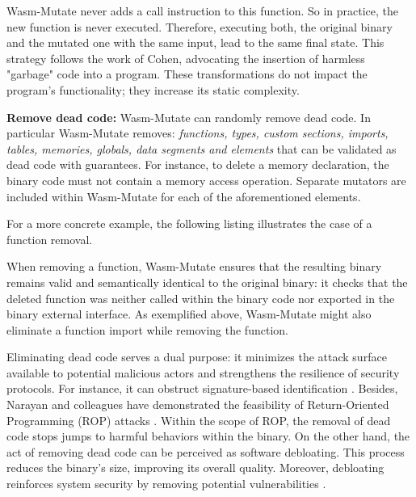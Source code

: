\documentclass[sigplan,screen]{acmart}
\newcommand*\badge[1]{ \colorbox{red}{\color{white}#1}}
\newcommand{\tool}{{\sc Wasm-Mutate}\xspace}
\newcommand{\todo}[1]{%
\refstepcounter{todo}
\noindent\textbf{\badge{TODO}} {\color{red}#1}
\addcontentsline{td}{todo}
{\color{red}\thesection.\thetodo\xspace #1}}
\begin{document}


\tool never adds a call instruction to this function.
So in practice, the new function is never executed.
Therefore, executing both, the original binary and the mutated one with the same input, lead to the same final state.
This strategy follows the work of Cohen, advocating the insertion of harmless "garbage" code into a program. 
These transformations do not impact the program's functionality; they increase its static complexity.

\textbf{Remove dead code:} \tool can randomly remove dead code.
In particular \tool removes: \emph{functions, types, custom sections, imports, tables, memories, globals, data segments and elements} that can be validated as dead code with guarantees.
For instance, to delete a memory declaration, the binary code must not contain a memory access operation. 
Separate mutators are included within \tool for each of the aforementioned elements.

For a more concrete example, the following listing illustrates the case of a function removal.



When removing a function, \tool ensures that the resulting binary remains valid and semantically identical to the original binary: it checks  that the deleted function was neither called within the binary code nor exported in the binary external interface. 
As exemplified above, \tool might also eliminate a function import while removing the function. 


Eliminating dead code serves a dual purpose: it minimizes the attack surface available to potential malicious actors and strengthens the resilience of security protocols. 
For instance, it can obstruct signature-based identification \cite{CABRERAARTEAGA2023103296}.
Besides, Narayan and colleagues have demonstrated the feasibility of Return-Oriented Programming (ROP) attacks \cite{Swivel}.
Within the scope of ROP, the removal of dead code stops jumps to harmful behaviors within the binary. 
On the other hand, the act of removing dead code can be perceived as software debloating. 
This process reduces the binary's size, improving its overall quality. 
Moreover, debloating reinforces system security by removing potential vulnerabilities \cite{236200}.
\end{document}

